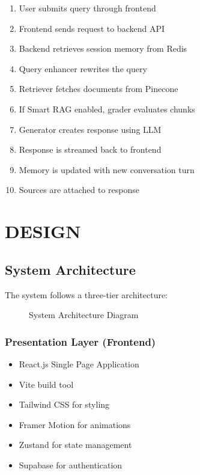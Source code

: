 \documentclass[12pt,a4paper]{book}
\numberwithin{table}{chapter}
\numberwithin{figure}{chapter}
\numberwithin{equation}{chapter}
\begin{document}
\begin{enumerate}
    \item User submits query through frontend
    \item Frontend sends request to backend API
    \item Backend retrieves session memory from Redis
    \item Query enhancer rewrites the query
    \item Retriever fetches documents from Pinecone
    \item If Smart RAG enabled, grader evaluates chunks
    \item Generator creates response using LLM
    \item Response is streamed back to frontend
    \item Memory is updated with new conversation turn
    \item Sources are attached to response
\end{enumerate}

\clearpage

\chapter{DESIGN}

\section{System Architecture}

The system follows a three-tier architecture:

\begin{figure}[h]
\caption{System Architecture Diagram}
\label{fig:architecture}
\end{figure}

\subsection{Presentation Layer (Frontend)}
\begin{itemize}
    \item React.js Single Page Application
    \item Vite build tool
    \item Tailwind CSS for styling
    \item Framer Motion for animations
    \item Zustand for state management
    \item Supabase for authentication
\end{itemize}
\end{document}
